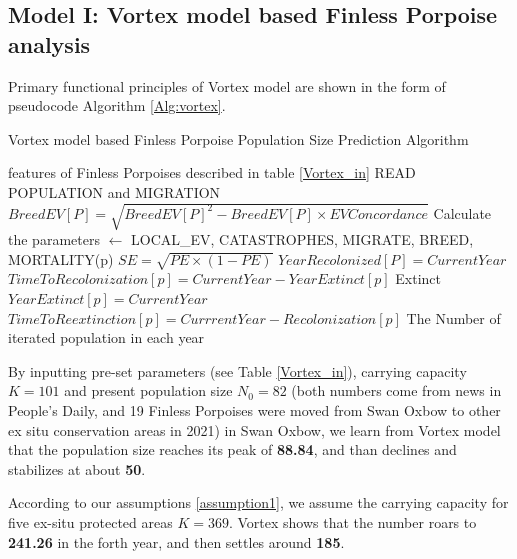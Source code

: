 \documentclass{mcmthesis}
\numberwithin{figure}{section}
\numberwithin{table}{section}
\numberwithin{equation}{section}
\begin{document}
\subsection{Model I: Vortex model based Finless Porpoise analysis}
Primary functional principles of Vortex model are shown in the form of
pseudocode Algorithm \ref{Alg:vortex}. 

\begin{algorithm}[htbp]
  \caption{Vortex model based Finless Porpoise Population Size Prediction Algorithm} 
  \label{Alg:vortex}
  \begin{algorithmic}[1]
    \Require
      features of Finless Porpoises described in table \ref{Vortex_in}
      \State READ POPULATION and MIGRATION
      \State $ BreedEV[P] = \sqrt{BreedEV[P]^2-BreedEV[P]\times EVConcordance} $
      \State Calculate the parameters $ \gets $ LOCAL\_EV, CATASTROPHES, MIGRATE, BREED, MORTALITY(p)
      \EndFor
      \State $SE = \sqrt{PE \times (1-PE)} $
      \State $ Year Recolonized[P] = Current Year $ 
      \Else \State $ TimeToRecolonization[p] = CurrentYear - YearExtinct[p]$ 
      \EndIf 
      \State Extinct
      \Else {} 
      \State $ YearExtinct[p] = CurrentYear $
      \EndIf
      \State $ TimeToReextinction[p] = CurrrentYear- Recolonization[p] $ 
      \EndIf
      \EndIf
      \EndFor
      \EndIf
      \EndFor
      \EndIf
      \EndFor
      \Ensure
      The Number of iterated population in each year
  \end{algorithmic}
\end{algorithm}

By inputting pre-set parameters (see Table \ref{Vortex_in}), 
carrying capacity $ K = 101 $ and present population size $ N_0 = 82 $
(both numbers come from news in People's Daily, and 19 Finless Porpoises were
moved from Swan Oxbow to other ex situ conservation areas in 2021) in Swan Oxbow, we learn from
Vortex model that the population size reaches its peak of \textbf{88.84}, and 
than declines and stabilizes at about \textbf{50}.
\par
According to our assumptions \ref{assumption1}, we assume the carrying capacity for five ex-situ protected areas 
$ K = 369 $. Vortex shows that the number roars to \textbf{241.26} in the forth 
year, and then settles around \textbf{185}. 
\end{document}
